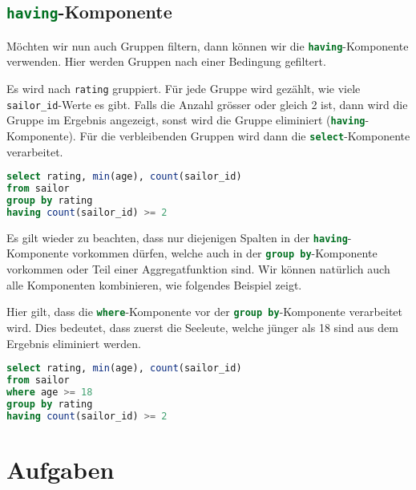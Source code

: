 \subsection{\lstinline[language=SQL]{having}-Komponente}

Möchten wir nun auch Gruppen filtern, dann können wir die \lstinline[language=SQL]{having}-Komponente verwenden. Hier werden Gruppen nach einer Bedingung gefiltert.

\begin{example}
Es wird nach \lstinline[language=SQL]{rating} gruppiert. Für jede Gruppe wird gezählt, wie viele \lstinline[language=SQL]{sailor_id}-Werte es gibt. Falls die Anzahl grösser oder gleich 2 ist, dann wird die Gruppe im Ergebnis angezeigt, sonst wird die Gruppe eliminiert (\lstinline[language=SQL]{having}-Komponente). Für die verbleibenden Gruppen wird dann die \lstinline[language=SQL]{select}-Komponente verarbeitet.
\begin{lstlisting}[language=SQL]
select rating, min(age), count(sailor_id)
from sailor
group by rating
having count(sailor_id) >= 2
\end{lstlisting}
\end{example}

Es gilt wieder zu beachten, dass nur diejenigen Spalten in der \lstinline[language=SQL]{having}-Komponente vorkommen dürfen, welche auch in der \lstinline[language=SQL]{group by}-Komponente vorkommen oder Teil einer Aggregatfunktion sind. Wir können natürlich auch alle Komponenten kombinieren, wie folgendes Beispiel zeigt.

\begin{example}
Hier gilt, dass die \lstinline[language=SQL]{where}-Komponente vor der \lstinline[language=SQL]{group by}-Komponente verarbeitet wird. Dies bedeutet, dass zuerst die Seeleute, welche jünger als 18 sind aus dem Ergebnis eliminiert werden.
\begin{lstlisting}[language=SQL]
select rating, min(age), count(sailor_id)
from sailor
where age >= 18
group by rating
having count(sailor_id) >= 2
\end{lstlisting}
\end{example}

\section{Aufgaben}

